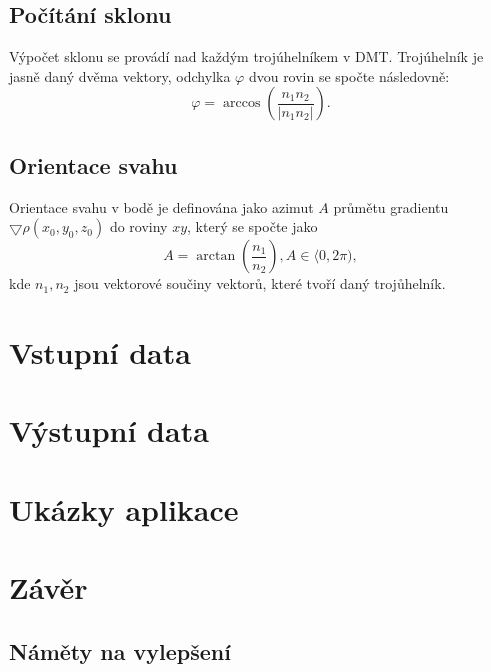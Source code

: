 \documentclass{article}
\begin{document}
\subsection{Počítání sklonu} 
\indent Výpočet sklonu se provádí nad každým trojúhelníkem v DMT. Trojúhelník je jasně daný dvěma vektory, odchylka $\varphi$ dvou rovin se spočte následovně: 
$$\varphi = \arccos(\frac{n_1n_2}{|n_1n_2|}).$$
\subsection{Orientace svahu}
\indent Orientace svahu v bodě je definována jako azimut $A$ průmětu gradientu $\bigtriangledown\rho(x_0,y_0,z_0)$ do roviny $xy$, který se spočte jako
$$A = \arctan(\frac{n_1}{n_2}), A\in\langle0,2\pi),$$
kde $n_1, n_2$ jsou vektorové součiny vektorů, které tvoří daný trojůhelník.
\bigskip
\clearpage
\newpage
\section{Vstupní data}

\section{Výstupní data}

\section{Ukázky aplikace} %
\clearpage
\newpage

\section{Závěr}
	\subsection{Náměty na vylepšení} %
	


\pagestyle{empty}

\clearpage

\end{document}
